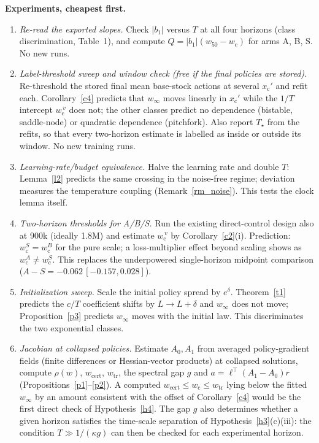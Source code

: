 \documentclass[11pt]{article}
\theoremstyle{definition}
\theoremstyle{remark}
\newcommand{\wcrit}{w_{\mathrm c}}
\newcommand{\wfifty}{w_{50}}
\newcommand{\xc}{x_{\mathrm c}}
\newcommand{\Tstar}{T_\star}
\begin{document}
\textbf{Experiments, cheapest first.}
\begin{enumerate}
\item \emph{Re-read the exported slopes.} Check $|b_1|$ versus $T$ at all four horizons (class discrimination, Table~1), and compute $Q=|b_1|(\wfifty-\wcrit)$ for arms A, B, S. No new runs.
\item \emph{Label-threshold sweep and window check (free if the final policies are stored).} Re-threshold the stored final mean base-stock actions at several $\xc'$ and refit each. Corollary~\ref{c4} predicts that $w_\infty$ moves linearly in $\xc'$ while the $1/T$ intercept $\wcrit^{\,v}$ does not; the other classes predict no dependence (bistable, saddle-node) or quadratic dependence (pitchfork). Also report $\Tstar$ from the refits, so that every two-horizon estimate is labelled as inside or outside its window. No new training runs.
\item \emph{Learning-rate/budget equivalence.} Halve the learning rate and double $T$: Lemma~\ref{l2} predicts the same crossing in the noise-free regime; deviation measures the temperature coupling (Remark~\ref{rm_noise}). This tests the clock lemma itself.
\item \emph{Two-horizon thresholds for A/B/S.} Run the existing direct-control design also at 900k (ideally 1.8M) and estimate $\wcrit^{\,v}$ by Corollary~\ref{c2}(i). Prediction: $\wcrit^S=\wcrit^B$ for the pure scale; a loss-multiplier effect beyond scaling shows as $\wcrit^A\neq\wcrit^S$. This replaces the underpowered single-horizon midpoint comparison ($A-S=-0.062\,[-0.157,0.028]$).
\item \emph{Initialization sweep.} Scale the initial policy spread by $e^{\delta}$. Theorem~\ref{t1} predicts the $c/T$ coefficient shifts by $L\to L+\delta$ and $w_\infty$ does not move; Proposition~\ref{p3} predicts $w_\infty$ moves with the initial law. This discriminates the two exponential classes.
\item \emph{Jacobian at collapsed policies.} Estimate $A_0,A_1$ from averaged policy-gradient fields (finite differences or Hessian-vector products) at collapsed solutions, compute $\rho(w)$, $w_{\mathrm{cert}}$, $w_{\mathrm{tr}}$, the spectral gap $g$ and $a=\ell^\top(A_1-A_0)r$ (Propositions~\ref{p1}--\ref{p2}). A computed $w_{\mathrm{cert}}\le\wcrit\le w_{\mathrm{tr}}$ lying below the fitted $w_\infty$ by an amount consistent with the offset of Corollary~\ref{c4} would be the first direct check of Hypothesis~\ref{h4}. The gap $g$ also determines whether a given horizon satisfies the time-scale separation of Hypothesis~\ref{h3}(c)(iii): the condition $T\gg1/(\kappa g)$ can then be checked for each experimental horizon.
\end{enumerate}
\end{document}
